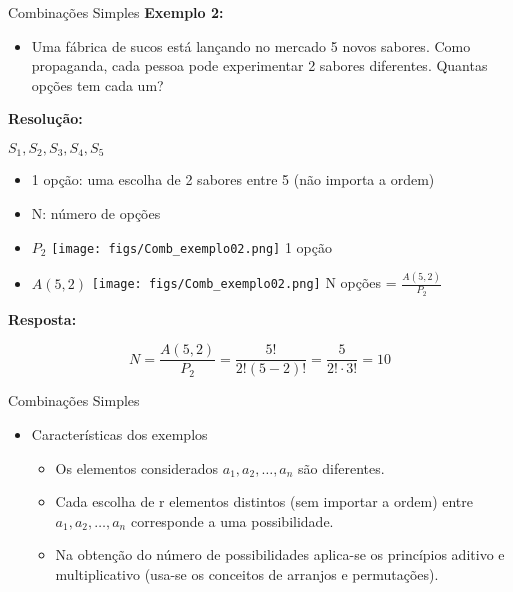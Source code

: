 \documentclass[aspectratio=169]{beamer}
\begin{document}
\begin{frame}{Combinações Simples}
    \textbf{Exemplo 2:} 

    \begin{itemize}
        \item[] Uma fábrica de sucos está lançando no mercado 5 novos sabores. Como propaganda, cada pessoa pode experimentar 2 sabores diferentes. Quantas opções tem cada um?
    \end{itemize}

    \pause
    \textbf{Resolução:}

    \begin{center}
        
    $S_1, S_2, S_3, S_4, S_5$
\end{center}

\pause
    \begin{itemize}
        \item 1 opção: uma escolha de 2 sabores entre 5 (não importa a ordem)
        \item N: número de opções \pause
    \end{itemize}

    \begin{itemize}
        \item[] $P_2$ \hspace{1cm} \texttt{[image: figs/Comb\_exemplo02.png]} \hspace{1cm} 1 opção \pause
        \item[] $A(5,2)$ \hspace{0.3cm} \texttt{[image: figs/Comb\_exemplo02.png]} \hspace{1cm} N opções = $\frac{A(5,2)}{P_2}$ 
    \end{itemize}

    \pause
     \textbf{Resposta:}

    $$ N = \frac{A(5,2)}{P_2} = \frac{5!}{2! (5-2)!} = \frac{5}{2! \cdot 3!} = 10$$


\end{frame}


\begin{frame}{Combinações Simples}
    \begin{itemize}
        \item[] Características dos exemplos
        \begin{itemize}
            \item Os elementos considerados $a_1, a_2, \ldots, a_n$ são diferentes.
            \item Cada escolha de r elementos distintos (sem importar a ordem) entre $a_1, a_2 , \ldots, a_n$ corresponde a uma possibilidade.
            \item Na obtenção do número de possibilidades aplica-se os princípios aditivo e multiplicativo (usa-se os conceitos de arranjos e permutações).
        \end{itemize}
    \end{itemize}

\end{frame}
\end{document}
